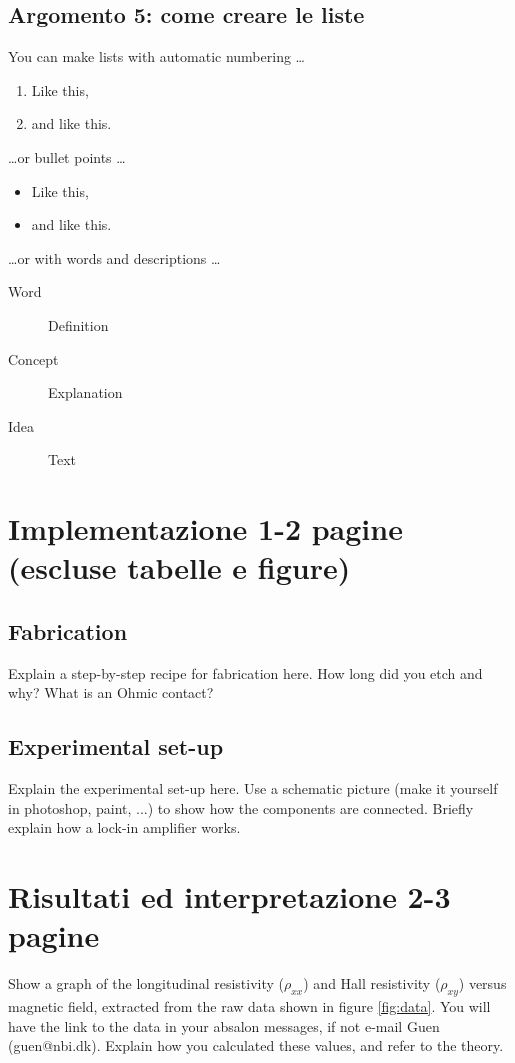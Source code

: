 \documentclass{article}
\begin{document}
\subsection{Argomento 5: come creare le liste}

You can make lists with automatic numbering \dots

\begin{enumerate}
\item Like this,
\item and like this.
\end{enumerate}
\dots or bullet points \dots
\begin{itemize}
\item Like this,
\item and like this.
\end{itemize}
\dots or with words and descriptions \dots
\begin{description}
\item[Word] Definition
\item[Concept] Explanation
\item[Idea] Text
\end{description}


\section{Implementazione 1-2 pagine (escluse tabelle e figure)}
\subsection{Fabrication}
Explain a step-by-step recipe for fabrication here. How long did you etch and why? What is an Ohmic contact?
\subsection{Experimental set-up}
Explain the experimental set-up here. Use a schematic picture (make it yourself in photoshop, paint, ...) to show how the components are connected. Briefly explain how a lock-in amplifier works.

\section{Risultati ed interpretazione 2-3 pagine}
Show a graph of the longitudinal resistivity ($\rho_{xx}$) and Hall resistivity ($\rho_{xy}$) versus magnetic field, extracted from the raw data shown in figure \ref{fig:data}. You will have the link to the data in your absalon messages, if not e-mail Guen (guen@nbi.dk). Explain how you calculated these values, and refer to the theory.
\end{document}
